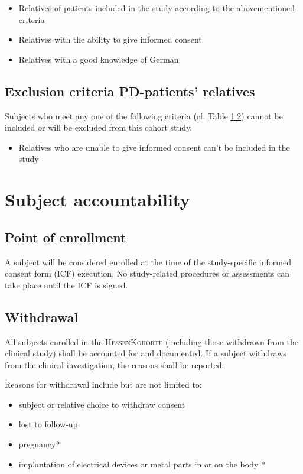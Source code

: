 \begin{itemize}
  \item Relatives of patients included in the study according to the abovementioned criteria 
  \item Relatives with the ability to give informed consent 
  \item Relatives with a good knowledge of German 
\end{itemize}

\subsection{Exclusion criteria \ac{PD}-patients' relatives}
\label{sec:exclusion_criteriaREL}
Subjects who meet any one of the following criteria (cf. Table \ref{}) cannot be included or will be excluded from this cohort study.
\begin{itemize}
  \item  Relatives who are unable to give informed consent can't be included in the study
\end{itemize}


\section{Subject accountability}

\subsection{Point of enrollment}
A subject will be considered enrolled at the time of the study-specific informed consent form (ICF) execution. No study-related procedures or assessments can take place until the ICF is signed.

\subsection{Withdrawal}
All subjects enrolled in the \textsc{HessenKohorte} (including those withdrawn from the clinical study) shall be accounted for and documented. If a subject withdraws from the clinical investigation, the reasons shall be reported.

Reasons for withdrawal include but are not limited to:
\begin{itemize}
  \item subject or relative choice to withdraw consent
  \item lost to follow-up
  \item pregnancy*
  \item implantation of electrical devices or metal parts in or on the body *
\end{itemize}

